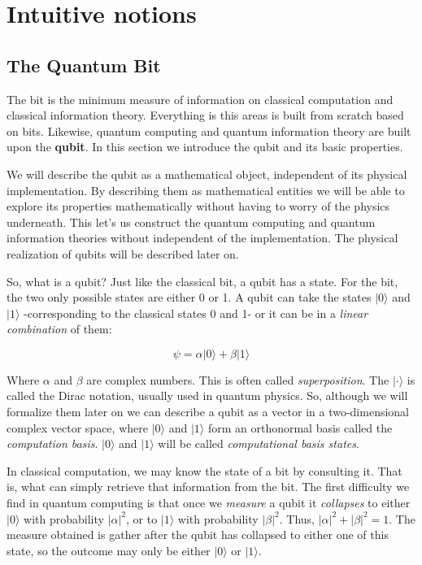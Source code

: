 	\section{Intuitive notions}
	
	\subsection{The Quantum Bit}
	
	The bit is the minimum measure of information on classical computation and classical information theory. Everything is this areas is built from scratch based on bits. Likewise, quantum computing and quantum information theory  are built upon the \textbf{qubit}. In this section we introduce the qubit and its basic properties.
	
	We will describe the qubit as a mathematical object, independent of its physical implementation. By describing them as mathematical entities we will be able to explore its properties mathematically without having to worry of the physics underneath. This let's us construct the quantum computing and quantum information theories without independent of the implementation. The physical realization of qubits will be described later on.
	
	So, what is a qubit? Just like the classical bit, a qubit has a state. For the bit, the two only possible states are either 0 or 1. A qubit can take the states $|0\rangle$ and $|1\rangle$ -corresponding to the classical states 0 and 1- or it can be in a \emph{linear combination} of them:
	
	$$ \psi = \alpha |0\rangle + \beta |1\rangle $$
	
	Where $\alpha$ and $\beta$ are complex numbers. This is often called \emph{superposition}. The $| \cdot \rangle$ is called the Dirac notation, usually used in quantum physics. So, although we will formalize them later on we can describe a qubit as a vector in a two-dimensional complex vector space, where $|0\rangle$ and $|1\rangle$ form an orthonormal basis called the \emph{computation basis}. $|0\rangle$ and $|1\rangle$ will be called \emph{computational basis states}.
	
	In classical computation, we may know the state of a bit by consulting it. That is, what can simply retrieve that information from the bit. The first difficulty we find in quantum computing is that once we \emph{measure} a qubit it \emph{collapses} to either $|0\rangle$ with probability $|\alpha|^2$, or to $|1\rangle$ with probability $|\beta|^2$. Thus, $|\alpha|^2 + |\beta|^2 = 1$. The measure obtained is gather after the qubit has collapsed to either one of this state, so the outcome may only be either $|0\rangle$ or $|1\rangle$.
	
